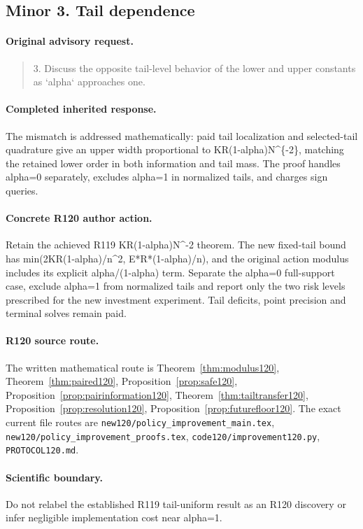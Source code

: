 \subsection{Minor 3. Tail dependence}
\label{response120:minor-3}
\paragraph{Original advisory request.}
\begin{quote}
3. Discuss the opposite tail-level behavior of the lower and upper constants as `alpha` approaches one.
\end{quote}
\paragraph{Completed inherited response.}
The mismatch is addressed mathematically: paid tail localization and selected-tail quadrature give an upper width proportional to KR(1-alpha)N\textasciicircum{}\{-2\}, matching the retained lower order in both information and tail mass. The proof handles alpha=0 separately, excludes alpha=1 in normalized tails, and charges sign queries.
\paragraph{Concrete R120 author action.}
Retain the achieved R119 KR(1-alpha)N\textasciicircum{}-2 theorem. The new fixed-tail bound has min(2KR(1-alpha)/n\textasciicircum{}2, E*R*(1-alpha)/n), and the original action modulus includes its explicit alpha/(1-alpha) term. Separate the alpha=0 full-support case, exclude alpha=1 from normalized tails and report only the two risk levels prescribed for the new investment experiment. Tail deficits, point precision and terminal solves remain paid.
\paragraph{R120 source route.}
The written mathematical route is Theorem~\ref{thm:modulus120}, Theorem~\ref{thm:paired120}, Proposition~\ref{prop:safe120}, Proposition~\ref{prop:pairinformation120}, Theorem~\ref{thm:tailtransfer120}, Proposition~\ref{prop:resolution120}, Proposition~\ref{prop:futurefloor120}. The exact current file routes are \nolinkurl{new120/policy_improvement_main.tex}, \nolinkurl{new120/policy_improvement_proofs.tex}, \nolinkurl{code120/improvement120.py}, \nolinkurl{PROTOCOL120.md}.
\paragraph{Scientific boundary.}
Do not relabel the established R119 tail-uniform result as an R120 discovery or infer negligible implementation cost near alpha=1.

